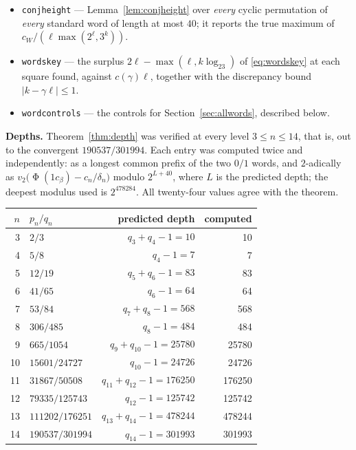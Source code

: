 \documentclass[11pt,reqno]{amsart}
\theoremstyle{plain}
\theoremstyle{definition}
\newcommand{\vt}{v_2}
\DeclareMathOperator{\Ph}{\Phi}
\begin{document}
\begin{itemize}
checked to be a cyclic permutation of the standard word of its own slope, by
exact set membership among all $\ell$ rotations.
\item \texttt{conjheight} --- Lemma~\ref{lem:conjheight} over \emph{every}
cyclic permutation of \emph{every} standard word of length at most $40$; it
reports the true maximum of $c_W/(\ell\max(2^\ell,3^k))$.
\item \texttt{wordskey} --- the surplus $2\ell-\max(\ell,k\log_23)$ of
\eqref{eq:wordskey} at each square found, against $c(\gamma)\ell$, together with
the discrepancy bound $|k-\gamma\ell|\le1$.
\item \texttt{wordcontrols} --- the controls for Section~\ref{sec:allwords},
described below.
\end{itemize}

\noindent\textbf{Depths.} Theorem~\ref{thm:depth} was verified at every level
$3\le n\le 14$, that is, out to the convergent $190537/301994$. Each entry was
computed twice and independently: as a longest common prefix of the two $0/1$
words, and $2$-adically as $\vt\bigl(\Ph(1c_\beta)-c_n/\delta_n\bigr)$ modulo
$2^{L+40}$, where $L$ is the predicted depth; the deepest modulus used is
$2^{478284}$. All twenty-four values agree with the theorem.

\begin{center}\small
\begin{tabular}{@{}rlrr@{}}
\toprule
$n$ & $p_n/q_n$ & predicted depth & computed\\
\midrule
 3 & $2/3$              & $q_3+q_4-1=10$           & 10\\
 4 & $5/8$              & $q_4-1=7$                & 7\\
 5 & $12/19$            & $q_5+q_6-1=83$           & 83\\
 6 & $41/65$            & $q_6-1=64$               & 64\\
 7 & $53/84$            & $q_7+q_8-1=568$          & 568\\
 8 & $306/485$          & $q_8-1=484$              & 484\\
 9 & $665/1054$         & $q_9+q_{10}-1=25780$     & 25780\\
10 & $15601/24727$      & $q_{10}-1=24726$         & 24726\\
11 & $31867/50508$      & $q_{11}+q_{12}-1=176250$ & 176250\\
12 & $79335/125743$     & $q_{12}-1=125742$        & 125742\\
13 & $111202/176251$    & $q_{13}+q_{14}-1=478244$ & 478244\\
14 & $190537/301994$    & $q_{14}-1=301993$        & 301993\\
\bottomrule
\end{tabular}
\end{center}
\end{document}
